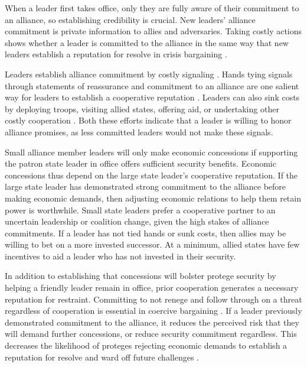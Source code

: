 \documentclass[12pt]{article}
\begin{document}
When a leader first takes office, only they are fully aware of their commitment to an alliance, so establishing credibility is crucial. 
New leaders' alliance commitment is private information to allies and adversaries. 
Taking costly actions shows whether a leader is committed to the alliance in the same way that new leaders establish a reputation for resolve in crisis bargaining \citep{Wolford2007}. 


Leaders establish alliance commitment by costly signaling \citep{Fearon1997}. 
Hands tying signals through statements of reassurance and commitment to an alliance are one salient way for leaders to establish a cooperative reputation \citep{Blankenship2020}.
Leaders can also sink costs by deploying troops, visiting allied states, offering aid, or undertaking other costly cooperation \citep{McManusNieman2019}.
Both these efforts indicate that a leader is willing to honor alliance promises, as less committed leaders would not make these signals.


Small alliance member leaders will only make economic concessions if supporting the patron state leader in office offers sufficient security benefits. 
Economic concessions thus depend on the large state leader's cooperative reputation. 
If the large state leader has demonstrated strong commitment to the alliance before making economic demands, then adjusting economic relations to help them retain power is worthwhile.
Small state leaders prefer a cooperative partner to an uncertain leadership or coalition change, given the high stakes of alliance commitments.
If a leader has not tied hands or sunk costs, then allies may be willing to bet on a more invested successor. 
At a minimum, allied states have few incentives to aid a leader who has not invested in their security. 


In addition to establishing that concessions will bolster protege security by helping a friendly leader remain in office, prior cooperation generates a necessary reputation for restraint. 
Committing to not renege and follow through on a threat regardless of cooperation is essential in coercive bargaining \citep{Cebuletal2021}. 
If a leader previously demonstrated commitment to the alliance, it reduces the perceived risk that they will demand further concessions, or reduce security commitment regardless.
This decreases the likelihood of proteges rejecting economic demands to establish a reputation for resolve and ward off future challenges \citep{Sechser2010, Sechser2018}. 
\end{document}
